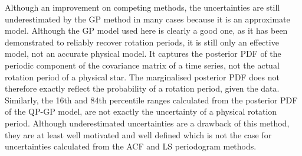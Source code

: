 \documentclass[a4paper,fleqn,usenatbib,useAMS]{mnras}
\begin{document}
Although an improvement on competing methods, the uncertainties are still
underestimated by the GP method in many cases because it is an approximate
model.
Although the GP model used here is clearly a good one, as it has been
demonstrated to reliably recover rotation periods, it is still only an
effective model, not an accurate physical model.
It captures the posterior PDF of the periodic component of the covariance
matrix of a time series, not the actual rotation period of a physical star.
The marginalised posterior PDF does not therefore exactly reflect the
probability of a rotation period, given the data.
Similarly, the 16th and 84th percentile ranges calculated from the posterior
PDF of the QP-GP model, are not exactly the uncertainty of a physical
rotation period.
Although underestimated uncertainties are a drawback of this method, they are
at least well motivated and well defined which is not the case for
uncertainties calculated from the ACF and LS periodogram methods.
\end{document}
